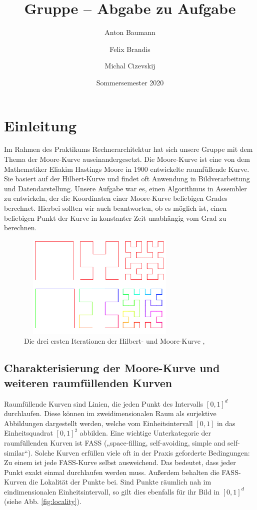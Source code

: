 \documentclass[course=erap]{aspdoc}
\author{Anton Baumann \and Felix Brandis \and Michal Cizevskij}
\date{Sommersemester 2020}
\title{Gruppe \theGroup{} -- Abgabe zu Aufgabe \theNumber}
\begin{document}
\maketitle

\section{Einleitung}
Im Rahmen des Praktikums Rechnerarchitektur hat sich unsere Gruppe mit dem Thema der Moore-Kurve auseinandergesetzt. Die Moore-Kurve ist eine von dem Mathematiker Eliakim Hastings Moore in 1900 entwickelte raumfüllende Kurve. Sie basiert auf der Hilbert-Kurve und findet oft Anwendung in Bildverarbeitung und Datendarstellung. Unsere Aufgabe war es, einen Algorithmus in Assembler zu entwickeln, der die Koordinaten einer Moore-Kurve beliebigen Grades berechnet. Hierbei sollten wir auch beantworten, ob es möglich ist, einen beliebigen Punkt der Kurve in konstanter Zeit unabhängig vom Grad zu berechnen.

\begin{figure}[h]
\centering
    \includegraphics[width=8cm, height=5cm]{Moore_and_Hilbert}
    \caption{Die drei ersten Iterationen der Hilbert- und Moore-Kurve \cite{pic:hilbert}, \cite{pic:Moore}}
    \label{fig:mooreCurve}
\end{figure}

\subsection{Charakterisierung der Moore-Kurve und weiteren raumfüllenden Kurven}
Raumfüllende Kurven sind Linien, die jeden Punkt des Intervalls $[0,1]^d$ durchlaufen. Diese können im zweidimensionalen Raum als surjektive Abbildungen dargestellt werden, welche vom Einheitsintervall $[0,1]$ in das Einheitsquadrat $[0,1]^2$ abbilden. 
\newline
Eine wichtige Unterkategorie der raumfüllenden Kurven ist FASS („space-filling, self-avoiding, simple and self-similar“). Solche Kurven  erfüllen viele oft in der Praxis geforderte Bedingungen: Zu einem ist jede FASS-Kurve selbst ausweichend. Das bedeutet, dass jeder Punkt exakt einmal durchlaufen werden muss. Außerdem behalten die FASS-Kurven die Lokalität der Punkte bei. Sind Punkte räumlich nah im eindimensionalen Einheitsintervall, so gilt dies ebenfalls für ihr Bild in $[0,1]^d$ (siehe Abb. \ref{fig:locality}). 
\end{document}
